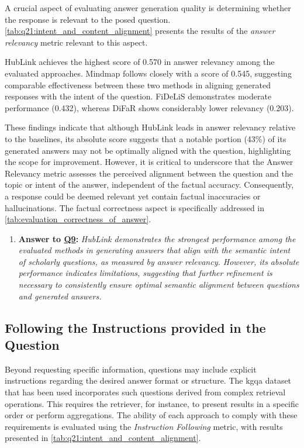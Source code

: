 A crucial aspect of evaluating answer generation quality is determining whether the response is relevant to the posed question. \autoref{tab:q21:intent_and_content_alignment} presents the results of the \emph{answer relevancy} metric relevant to this aspect.

HubLink achieves the highest score of 0.570 in answer relevancy among the evaluated approaches. Mindmap follows closely with a score of 0.545, suggesting comparable effectiveness between these two methods in aligning generated responses with the intent of the question. FiDeLiS demonstrates moderate performance (0.432), whereas DiFaR shows considerably lower relevancy (0.203).

These findings indicate that although HubLink leads in answer relevancy relative to the baselines, its absolute score suggests that a notable portion (43\%) of its generated answers may not be optimally aligned with the question, highlighting the scope for improvement. However, it is critical to underscore that the Answer Relevancy metric assesses the perceived alignment between the question and the topic or intent of the answer, independent of the factual accuracy. Consequently, a response could be deemed relevant yet contain factual inaccuracies or hallucinations. The factual correctness aspect is specifically addressed in \autoref{tab:evaluation_correctness_of_answer}.

\begin{enumerate}[label={}]
 \item \textbf{Answer to \hyperref[sec:evaluation_gqm_plan]{Q9}:} \textit{HubLink demonstrates the strongest performance among the evaluated methods in generating answers that align with the semantic intent of scholarly questions, as measured by answer relevancy. However, its absolute performance indicates limitations, suggesting that further refinement is necessary to consistently ensure optimal semantic alignment between questions and generated answers.}
\end{enumerate}

\subsection{Following the Instructions provided in the Question}

Beyond requesting specific information, questions may include explicit instructions regarding the desired answer format or structure. The \gls{kgqa} dataset that has been used incorporates such questions derived from complex retrieval operations. This requires the retriever, for instance, to present results in a specific order or perform aggregations. The ability of each approach to comply with these requirements is evaluated using the \emph{Instruction Following} metric, with results presented in \autoref{tab:q21:intent_and_content_alignment}.

